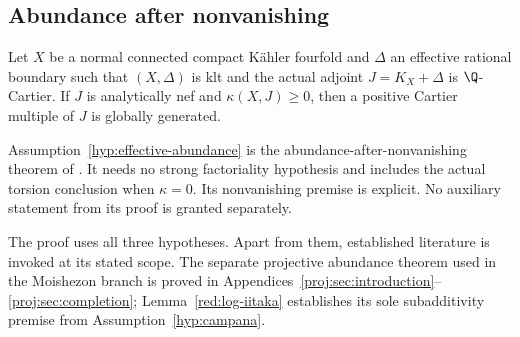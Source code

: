 \subsection{Abundance after nonvanishing}

\begin{assumption}
\label{hyp:effective-abundance}
Let \(X\) be a normal connected compact K\"ahler fourfold and
\(\Delta\) an effective rational boundary such that
\((X,\Delta)\) is klt and the actual adjoint
\(J=K_X+\Delta\) is \(\Q\)-Cartier. If \(J\) is analytically
nef and \(\kappa(X,J)\ge0\), then a positive Cartier multiple of
\(J\) is globally generated.
\end{assumption}

Assumption~\ref{hyp:effective-abundance} is the abundance-after-nonvanishing
theorem of \cite[Theorem~1.1]{GrantEffectiveAbundance}. It needs no strong
factoriality hypothesis and includes the actual torsion conclusion
when \(\kappa=0\). Its nonvanishing premise is explicit. No
auxiliary statement from its proof is granted separately.

The proof uses all three hypotheses. Apart from them, established
literature is invoked at its stated scope. The separate projective
abundance theorem used in the Moishezon branch is proved in
Appendices~\ref{proj:sec:introduction}--\ref{proj:sec:completion};
Lemma~\ref{red:log-iitaka} establishes its sole subadditivity premise
from Assumption~\ref{hyp:campana}.
